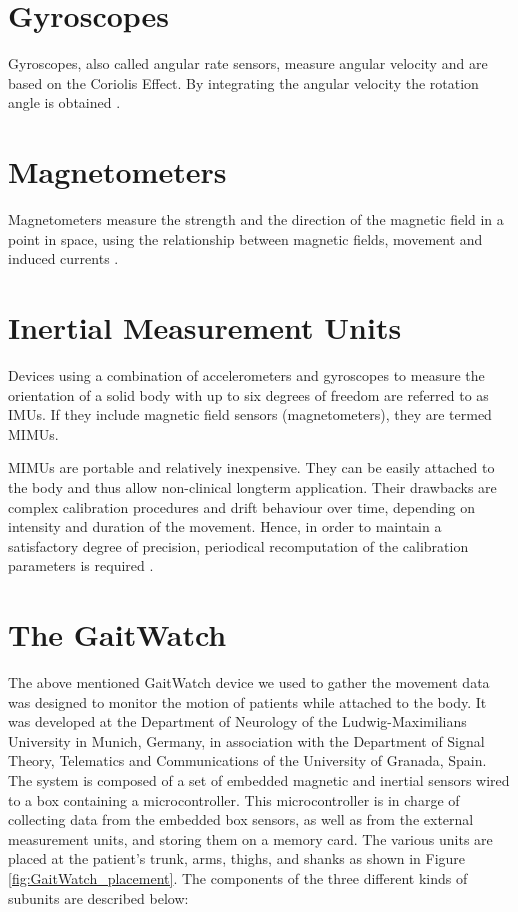 \section{Gyroscopes}

Gyroscopes, also called angular rate sensors, measure angular velocity and are based on the Coriolis Effect. By integrating the angular velocity the rotation angle is obtained \cite{olivares_vicente_signal_2013}.

\section{Magnetometers}

Magnetometers measure the strength and the direction of the magnetic field in a point in space, using the relationship between magnetic fields, movement and induced currents \cite{olivares_vicente_signal_2013}.

\section{Inertial Measurement Units}

Devices using a combination of accelerometers and gyroscopes to measure the orientation of a solid body with up to six degrees of freedom are referred to as \glspl{IMU}. If they include magnetic field sensors (magnetometers), they are termed \glspl{MIMU}.

\glspl{MIMU} are portable and relatively inexpensive. They can be easily attached to the body and thus allow non-clinical longterm application. Their drawbacks are complex calibration procedures and drift behaviour over time, depending on intensity and duration of the movement. Hence, in order to maintain a satisfactory degree of precision, periodical recomputation of the calibration parameters is required \cite{olivares_vicente_signal_2013}.

\section{The GaitWatch}

The above mentioned GaitWatch device we used to gather the movement data was designed to monitor the motion of patients while attached to the body. It was developed at the Department of Neurology of the Ludwig-Maximilians University in Munich, Germany, in association with the Department of Signal Theory, Telematics and Communications of the University of Granada, Spain. The system is composed of a set of embedded magnetic and inertial sensors wired to a box containing a microcontroller. This microcontroller is in charge of collecting data from the embedded box sensors, as well as from the external measurement units, and storing them on a memory card. The various units are placed at the patient's trunk, arms, thighs, and shanks as shown in Figure \ref{fig:GaitWatch_placement}. The components of the three different kinds of subunits are described below:



